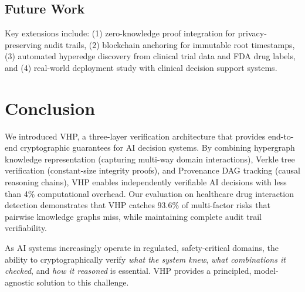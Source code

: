 \documentclass[11pt,a4paper]{article}
\begin{document}
\subsection{Future Work}

Key extensions include: (1) zero-knowledge proof integration for privacy-preserving audit trails, (2) blockchain anchoring for immutable root timestamps, (3) automated hyperedge discovery from clinical trial data and FDA drug labels, and (4) real-world deployment study with clinical decision support systems.

\section{Conclusion}
\label{sec:conclusion}

We introduced VHP, a three-layer verification architecture that provides end-to-end cryptographic guarantees for AI decision systems. By combining hypergraph knowledge representation (capturing multi-way domain interactions), Verkle tree verification (constant-size integrity proofs), and Provenance DAG tracking (causal reasoning chains), VHP enables independently verifiable AI decisions with less than 4\% computational overhead. Our evaluation on healthcare drug interaction detection demonstrates that VHP catches 93.6\% of multi-factor risks that pairwise knowledge graphs miss, while maintaining complete audit trail verifiability.

As AI systems increasingly operate in regulated, safety-critical domains, the ability to cryptographically verify \textit{what the system knew}, \textit{what combinations it checked}, and \textit{how it reasoned} is essential. VHP provides a principled, model-agnostic solution to this challenge.
\end{document}
